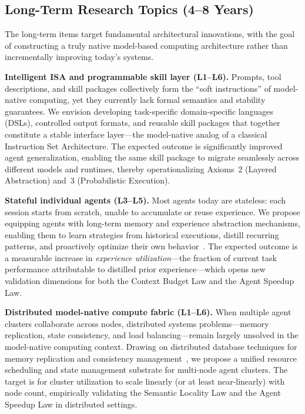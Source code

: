 \documentclass[11pt,a4paper]{article}
\begin{document}
\subsection{Long-Term Research Topics (4--8 Years)}

The long-term items target fundamental architectural innovations, with the goal of constructing a truly native model-based computing architecture rather than incrementally improving today's systems.

\textbf{Intelligent ISA and programmable skill layer (L1--L6).}
Prompts, tool descriptions, and skill packages collectively form the ``soft instructions'' of model-native computing, yet they currently lack formal semantics and stability guarantees.
We envision developing task-specific domain-specific languages (DSLs), controlled output formats, and reusable skill packages that together constitute a stable interface layer---the model-native analog of a classical Instruction Set Architecture.
The expected outcome is significantly improved agent generalization, enabling the same skill package to migrate seamlessly across different models and runtimes, thereby operationalizing Axioms~2 (Layered Abstraction) and~3 (Probabilistic Execution).

\textbf{Stateful individual agents (L3--L5).}
Most agents today are stateless: each session starts from scratch, unable to accumulate or reuse experience.
We propose equipping agents with long-term memory and experience abstraction mechanisms, enabling them to learn strategies from historical executions, distill recurring patterns, and proactively optimize their own behavior~\cite{amem2025,agentmemorysurvey2025}.
The expected outcome is a measurable increase in \textit{experience utilization}---the fraction of current task performance attributable to distilled prior experience---which opens new validation dimensions for both the Context Budget Law and the Agent Speedup Law.

\textbf{Distributed model-native compute fabric (L1--L6).}
When multiple agent clusters collaborate across nodes, distributed systems problems---memory replication, state consistency, and load balancing---remain largely unsolved in the model-native computing context.
Drawing on distributed database techniques for memory replication and consistency management~\cite{spanner2012,raft2014}, we propose a unified resource scheduling and state management substrate for multi-node agent clusters.
The target is for cluster utilization to scale linearly (or at least near-linearly) with node count, empirically validating the Semantic Locality Law and the Agent Speedup Law in distributed settings.
\end{document}

